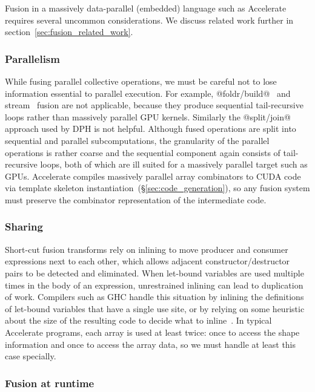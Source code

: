 Fusion in a massively data-parallel (embedded) language such as Accelerate
requires several uncommon considerations. We discuss related work further in
section~\ref{sec:fusion_related_work}.

\subsubsection{Parallelism}

While fusing parallel collective operations, we must be careful not to lose
information essential to parallel execution. For example,
@foldr/build@~\cite{Gill:1993de} and
stream~\cite{Coutts:2007kp} fusion are not applicable,
because they produce sequential tail-recursive loops rather than massively
parallel GPU kernels. Similarly the
@split/join@~\cite{Keller:1999ic} approach used by
DPH is not helpful. Although fused operations are
split into sequential and parallel subcomputations, the granularity of the
parallel operations is rather coarse and the sequential component again consists
of tail-recursive loops, both of which are ill suited for a massively parallel
target such as GPUs. Accelerate compiles massively parallel array combinators to
CUDA code via template skeleton instantiation~(\S\ref{sec:code_generation}), so
any fusion system must preserve the combinator representation of the
intermediate code.


\subsubsection{Sharing}

Short-cut fusion transforms rely on inlining to move
producer and consumer expressions next to each other, which allows adjacent
constructor/destructor pairs to be detected and eliminated. When let-bound
variables are used multiple times in the body of an expression, unrestrained
inlining can lead to duplication of work. Compilers such as GHC handle this
situation by inlining the definitions of let-bound variables that have a single
use site, or by relying on some heuristic about the size of the resulting code
to decide what to inline~\cite{PeytonJones:2003gb}. In typical Accelerate
programs, each array is used at least twice: once to access the shape
information and once to access the array data, so we must handle at least this
case specially.

\subsubsection{Fusion at runtime}

